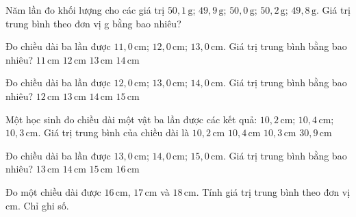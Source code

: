 \begin{ex}
Năm lần đo khối lượng cho các giá trị $50,1\,\text{g}$; $49,9\,\text{g}$; $50,0\,\text{g}$; $50,2\,\text{g}$; $49,8\,\text{g}$. Giá trị trung bình theo đơn vị g bằng bao nhiêu?
\end{ex}

\begin{ex}
Đo chiều dài ba lần được $11,0\,\text{cm}$; $12,0\,\text{cm}$; $13,0\,\text{cm}$. Giá trị trung bình bằng bao nhiêu?
\choice
{$11\,\text{cm}$}
{\True $12\,\text{cm}$}
{$13\,\text{cm}$}
{$14\,\text{cm}$}
\end{ex}

\begin{ex}
Đo chiều dài ba lần được $12,0\,\text{cm}$; $13,0\,\text{cm}$; $14,0\,\text{cm}$. Giá trị trung bình bằng bao nhiêu?
\choice
{$12\,\text{cm}$}
{\True $13\,\text{cm}$}
{$14\,\text{cm}$}
{$15\,\text{cm}$}
\end{ex}

\begin{ex}
Một học sinh đo chiều dài một vật ba lần được các kết quả: $10,2\,\mathrm{cm}$; $10,4\,\mathrm{cm}$; $10,3\,\mathrm{cm}$. Giá trị trung bình của chiều dài là
\choice
{$10,2\,\mathrm{cm}$}
{$10,4\,\mathrm{cm}$}
{\True $10,3\,\mathrm{cm}$}
{$30,9\,\mathrm{cm}$}
\end{ex}

\begin{ex}
Đo chiều dài ba lần được $13,0\,\text{cm}$; $14,0\,\text{cm}$; $15,0\,\text{cm}$. Giá trị trung bình bằng bao nhiêu?
\choice
{$13\,\text{cm}$}
{\True $14\,\text{cm}$}
{$15\,\text{cm}$}
{$16\,\text{cm}$}
\end{ex}

\begin{ex}
Đo một chiều dài được $16\,\text{cm}$, $17\,\text{cm}$ và $18\,\text{cm}$. Tính giá trị trung bình theo đơn vị cm. Chỉ ghi số.
\end{ex}


